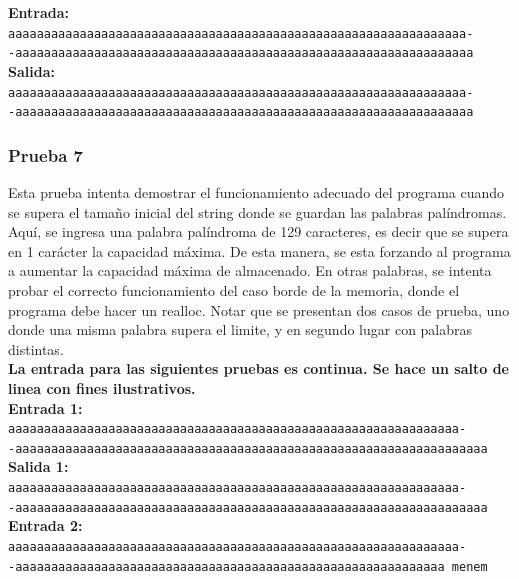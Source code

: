 \documentclass[a4paper, 10pt]{article}
\def\code#1{\texttt{#1}}
\newcommand\tab[1][0.5cm]{\hspace*{#1}}
\begin{document}
        \textbf{Entrada:}\\
        \tab\tab\code{aaaaaaaaaaaaaaaaaaaaaaaaaaaaaaaaaaaaaaaaaaaaaaaaaaaaaaaaaaaaaaaa-\\-aaaaaaaaaaaaaaaaaaaaaaaaaaaaaaaaaaaaaaaaaaaaaaaaaaaaaaaaaaaaaaaa}\\

        \textbf{Salida:}\\
        \tab\tab\code{aaaaaaaaaaaaaaaaaaaaaaaaaaaaaaaaaaaaaaaaaaaaaaaaaaaaaaaaaaaaaaaa-\\-aaaaaaaaaaaaaaaaaaaaaaaaaaaaaaaaaaaaaaaaaaaaaaaaaaaaaaaaaaaaaaaa}\\

      \subsubsection{Prueba 7}
        Esta prueba intenta demostrar el funcionamiento adecuado del
        programa cuando se supera el tamaño inicial del string donde se guardan
        las palabras palíndromas. Aquí, se ingresa una palabra palíndroma de 129
        caracteres, es decir que se supera en 1 carácter la capacidad máxima.
        De esta manera, se esta forzando al programa a aumentar la capacidad
        máxima de almacenado. En otras palabras, se intenta probar el correcto
        funcionamiento del caso borde de la memoria, donde el programa debe
        hacer un realloc. Notar que se presentan dos casos de prueba, uno donde
        una misma palabra supera el limite, y en segundo lugar con palabras
        distintas.\\
        \textbf{La entrada para las siguientes pruebas es continua. Se hace un salto
        de linea con fines ilustrativos.}\\

        \textbf{Entrada 1:}\\
        \tab\tab\code{aaaaaaaaaaaaaaaaaaaaaaaaaaaaaaaaaaaaaaaaaaaaaaaaaaaaaaaaaaaaaaa-\\-aaaaaaaaaaaaaaaaaaaaaaaaaaaaaaaaaaaaaaaaaaaaaaaaaaaaaaaaaaaaaaaaaa}\\

        \textbf{Salida 1:}\\
        \tab\tab\code{aaaaaaaaaaaaaaaaaaaaaaaaaaaaaaaaaaaaaaaaaaaaaaaaaaaaaaaaaaaaaaa-\\-aaaaaaaaaaaaaaaaaaaaaaaaaaaaaaaaaaaaaaaaaaaaaaaaaaaaaaaaaaaaaaaaaa}\\

        \textbf{Entrada 2:}\\
        \tab\tab\code{aaaaaaaaaaaaaaaaaaaaaaaaaaaaaaaaaaaaaaaaaaaaaaaaaaaaaaaaaaaaaaa-\\-aaaaaaaaaaaaaaaaaaaaaaaaaaaaaaaaaaaaaaaaaaaaaaaaaaaaaaaaaaaa menem}\\
\end{document}
